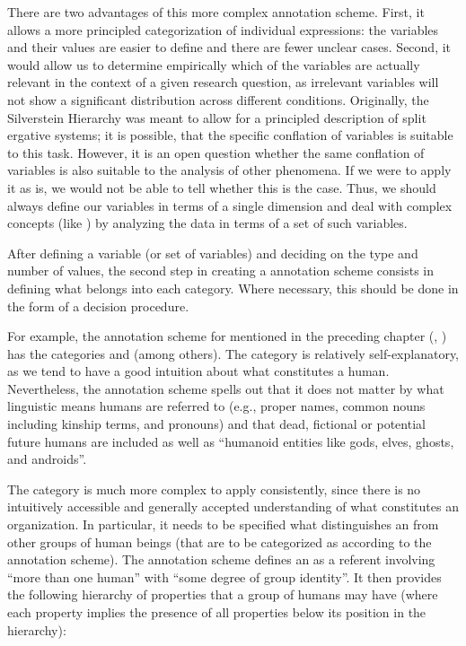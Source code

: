 There are two advantages of this more complex annotation scheme. First, it allows a more principled categorization of individual expressions: the variables and their values are easier to define and there are fewer unclear cases. Second, it would allow us to determine empirically which of the variables are actually relevant in the context of a given research question, as irrelevant variables will not show a significant distribution across different conditions. Originally, the Silverstein Hierarchy was meant to allow for a principled description of split ergative systems; it is possible, that the specific conflation of variables is suitable to this task. However, it is an open question whether the same conflation of variables is also suitable to the analysis of other phenomena. If we were to apply it as is, we would not be able to tell whether this is the case. Thus, we should always define our variables in terms of a single dimension and deal with complex concepts (like ) by analyzing the data in terms of a set of such variables.

After defining a variable (or set of variables) and deciding on the type and number of values, the second step in creating a annotation scheme consists in defining what belongs into each category. Where necessary, this should be done in the form of a decision procedure.

For example, the annotation scheme for  mentioned in the preceding chapter (\citealt{garretson_coding_2004}, \citealt{zaenen_animacy_2004}) has the categories  and  (among others). The category  is relatively self-explanatory, as we tend to have a good intuition about what constitutes a human. Nevertheless, the annotation scheme spells out that it does not matter by what linguistic means humans are referred to (e.g., proper names, common nouns including kinship terms, and pronouns) and that dead, fictional or potential future humans are included as well as ``humanoid entities like gods, elves, ghosts, and androids''.

The category  is much more complex to apply consistently, since there is no intuitively accessible and generally accepted understanding of what constitutes an organization. In particular, it needs to be specified what distinguishes an  from other groups of human beings (that are to be categorized as  according to the annotation scheme). The annotation scheme defines an  as a referent involving ``more than one human'' with ``some degree of group identity''. It then provides the following hierarchy of properties that a group of humans may have (where each property implies the presence of all properties below its position in the hierarchy):

